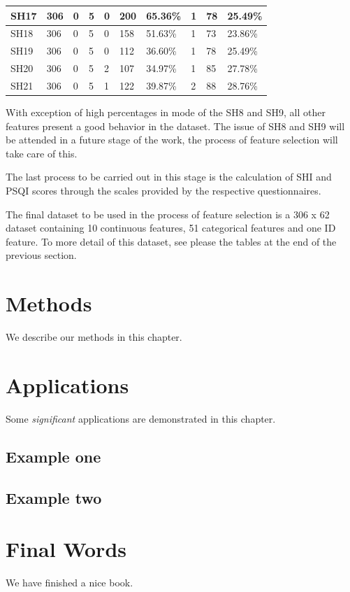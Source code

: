 \documentclass[]{book}
\begin{document}
\begin{table}[ht]
\begin{tabular}{|l|l|l|l|l|l|l|l|l|l|}
SH17    & 306   & 0    & 5    & 0    & 200      & 65.36\%  & 1     & 78        & 25.49\%   \\ \hline
SH18    & 306   & 0    & 5    & 0    & 158      & 51.63\%  & 1     & 73        & 23.86\%   \\ \hline
SH19    & 306   & 0    & 5    & 0    & 112      & 36.60\%  & 1     & 78        & 25.49\%   \\ \hline
SH20    & 306   & 0    & 5    & 2    & 107      & 34.97\%  & 1     & 85        & 27.78\%   \\ \hline
SH21    & 306   & 0    & 5    & 1    & 122      & 39.87\%  & 2     & 88        & 28.76\%   \\ \hline
\end{tabular}
\end{table}

With exception of high percentages in mode of the SH8 and SH9, all other
features present a good behavior in the dataset. The issue of SH8 and
SH9 will be attended in a future stage of the work, the process of
feature selection will take care of this.

The last process to be carried out in this stage is the calculation of
SHI and PSQI scores through the scales provided by the respective
questionnaires.

The final dataset to be used in the process of feature selection is a
306 x 62 dataset containing 10 continuous features, 51 categorical
features and one ID feature. To more detail of this dataset, see please
the tables at the end of the previous section.

\chapter{Methods}\label{methods}

We describe our methods in this chapter.

\chapter{Applications}\label{applications}

Some \emph{significant} applications are demonstrated in this chapter.

\section{Example one}\label{example-one}

\section{Example two}\label{example-two}

\chapter{Final Words}\label{final-words}

We have finished a nice book.


\end{document}

